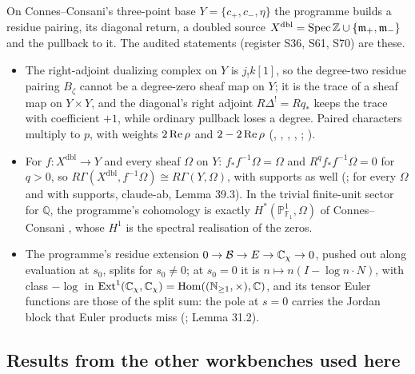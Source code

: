 On Connes--Consani's three-point base $Y=\{c_+,c_-,\eta\}$ the programme builds a residue pairing, its diagonal return, a doubled source $X^{\mathrm{dbl}}=\operatorname{Spec}\mathbb{Z}\cup\{\mathfrak m_+,\mathfrak m_-\}$ and the pullback to it. The audited statements (register S36, S61, S70) are these.
\begin{itemize}
\item The right-adjoint dualizing complex on $Y$ is $j_!k[1]$, so the degree-two residue pairing $B_\zeta$ cannot be a degree-zero sheaf map on $Y$; it is the trace of a sheaf map on $Y\times Y$, and the diagonal's right adjoint $R\Delta^!=Rq_*$ keeps the trace with coefficient $+1$, while ordinary pullback loses a degree. Paired characters multiply to $p$, with weights $2\operatorname{Re}\rho$ and $2-2\operatorname{Re}\rho$ (, , , , ; ).
\item For $f:X^{\mathrm{dbl}}\to Y$ and every sheaf $\Omega$ on $Y$: $f_*f^{-1}\Omega=\Omega$ and $R^qf_*f^{-1}\Omega=0$ for $q>0$, so $R\Gamma(X^{\mathrm{dbl}},f^{-1}\Omega)\cong R\Gamma(Y,\Omega)$, with supports as well (; for every $\Omega$ and with supports, claude-ab,  Lemma 39.3). In the trivial finite-unit sector for $\mathbb{Q}$, the programme's cohomology is exactly $H^*(\mathbb{P}^1_{\mathbb{F}_1},\Omega)$ of Connes--Consani \cite{CCP1}, whose $H^1$ is the spectral realisation of the zeros.
\item The programme's residue extension $0\to\mathcal{B}\to E\to\mathbb{C}_\chi\to0$, pushed out along evaluation at $s_0$, splits for $s_0\ne0$; at $s_0=0$ it is $n\mapsto n(I-\log n\cdot N)$, with class $-\log$ in $\operatorname{Ext}^1(\mathbb{C}_\chi,\mathbb{C}_\chi)=\operatorname{Hom}((\mathbb{N}_{\ge1},\times),\mathbb{C})$, and its tensor Euler functions are those of the split sum: the pole at $s=0$ carries the Jordan block that Euler products miss (;  Lemma 31.2).
\end{itemize}

\subsection{Results from the other workbenches used here}

